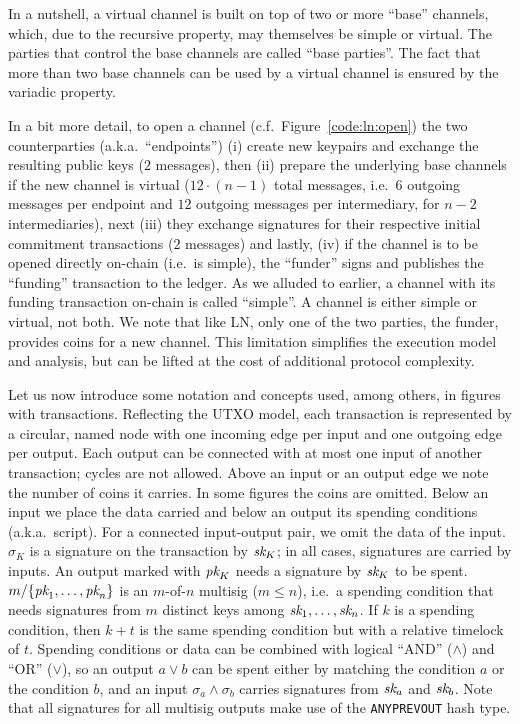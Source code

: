   In a nutshell, a virtual channel is built on top of two or more ``base''
  channels, which, due to the recursive property, may themselves be simple or
  virtual. The parties that control the base channels are called ``base
  parties''. The fact that more than two base channels can be used by a 
  virtual channel is ensured by the variadic property.

  In a bit more detail, to open a channel (c.f.\ Figure~\ref{code:ln:open}) the two
  counterparties (a.k.a.\ ``endpoints'') (i) create new keypairs and exchange
  the resulting public keys ($2$ messages), then (ii) prepare the underlying
  base channels if the new channel is virtual ($12 \cdot (n-1)$ total messages,
  i.e.\ $6$ outgoing messages per endpoint and $12$ outgoing messages per
  intermediary, for $n-2$ intermediaries), next (iii) they exchange signatures
  for their respective initial commitment transactions ($2$ messages) and
  lastly, (iv) if the channel is to be opened directly on-chain (i.e.\ is
  simple), the ``funder'' signs and publishes the ``funding'' transaction to the
  ledger. As we alluded to earlier, a channel with its funding transaction
  on-chain is called ``simple''. A channel is either simple or virtual, not
  both. We note that like LN, only one of the two parties, the funder,
  provides coins for a new channel. This limitation simplifies the execution
  model and analysis, but can be lifted at the cost of additional protocol
  complexity.

  Let us now introduce some notation and concepts used, among others, in figures
  with transactions.
  Reflecting the UTXO model, each transaction is represented by a circular,
  named node with one incoming edge per input and one outgoing edge per output.
  Each output can be connected with at most one input of another transaction;
  cycles are not allowed. Above an input or an output edge we note the number of
  coins it carries. In some figures the coins are omitted. Below an input we
  place the data carried and below an output its spending conditions (a.k.a.\
  script). For
  a connected input-output pair, we omit the data of the input.
  $\sigma_K$ is a signature on the transaction by $\textit{sk}_{K}$; in all cases, signatures
  are carried by inputs. An output marked
  with $\textit{pk}_{K}$ needs a signature by $\textit{sk}_{K}$ to be spent. $m/\{\textit{pk}_{1}, \dots,
  \textit{pk}_{n}\}$ is an $m$-of-$n$ multisig ($m \leq n$), i.e.\ a spending condition that needs signatures from
  $m$ distinct keys among $\textit{sk}_{1}, \dots, \textit{sk}_{n}$. If $k$ is a spending
  condition, then $k + t$ is the same spending condition but with a relative timelock
  of $t$. Spending conditions or data can be combined with logical ``AND''
  ($\wedge$) and ``OR'' ($\vee$), so an output $a \vee b$ can be spent either by
  matching the condition $a$ or the condition $b$, and an input $\sigma_a \wedge
  \sigma_b$ carries signatures from $\textit{sk}_{a}$ and $\textit{sk}_{b}$.
  Note that all signatures for all multisig outputs make use of the
  \texttt{ANYPREVOUT} hash type.

